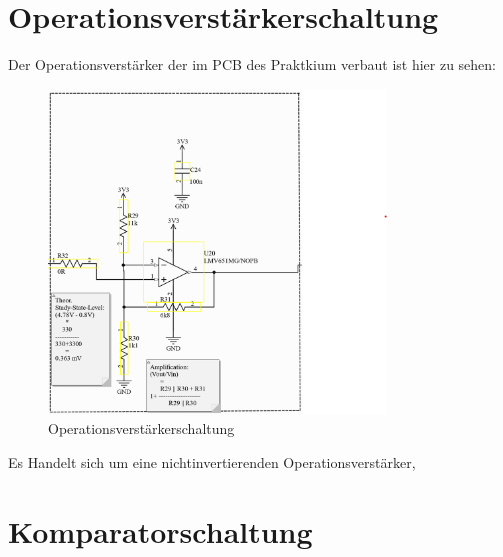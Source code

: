 \section{Operationsverstärkerschaltung} %
Der Operationsverstärker der im PCB des Praktkium verbaut ist hier zu sehen:
\begin{figure}[H]
    \centering
    \includegraphics[width=0.8\textwidth]{Pictures/OP_Verstaerker.png}
    \caption{Operationsverstärkerschaltung}
    \label{fig:opamp_schaltung}
\end{figure}
Es Handelt sich um eine nichtinvertierenden Operationsverstärker,

\section{Komparatorschaltung} %
\clearpage